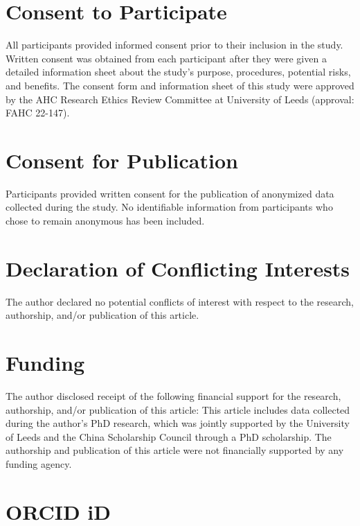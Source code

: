 \documentclass[10pt,a4paper]{article}
\begin{document}
\section*{Consent to Participate}
All participants provided informed consent prior to their inclusion in the study. Written consent was obtained from each participant after they were given a detailed information sheet about the study’s purpose, procedures, potential risks, and benefits. The consent form and information sheet of this study were approved by the AHC Research Ethics Review Committee at University of Leeds (approval: FAHC 22-147).\par
\section*{Consent for Publication}
Participants provided written consent for the publication of anonymized data collected during the study. No identifiable information from participants who chose to remain anonymous has been included.\par
\section*{Declaration of Conflicting Interests}
The author declared no potential conflicts of interest with respect to the research, authorship, and/or publication of this article.\par
\section*{Funding}
The author disclosed receipt of the following financial support for the research, authorship, and/or publication of this article: This article includes data collected during the author’s PhD research, which was jointly supported by the University of Leeds and the China Scholarship Council through a PhD scholarship. The authorship and publication of this article were not financially supported by any funding agency.\par
\section*{ORCID iD}
\end{document}
